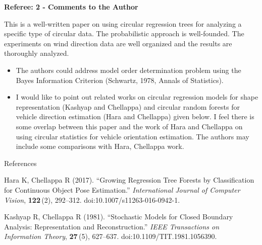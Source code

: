 \documentclass[english, noconfig]{uibklttr}
\newcommand{\section}[1]{{\Large{\textbf{#1}}}}
\begin{document}
\section{Referee: 2 - Comments to the Author}

This is a well-written paper on using circular regression trees for analyzing a
specific type of circular data. The probabilistic approach is well-founded. The
experiments on wind direction data are well organized and the results are
thoroughly analyzed.

\begin{itemize}
\item The authors could address model order determination problem using the
Bayes Information Criterion (Schwartz, 1978, Annals of Statistics).  

\item I would like to point out related works on circular regression models for
shape representation (Kashyap and Chellappa) and circular random forests for
vehicle direction estimation (Hara and Chellappa) given below. I feel there is
some overlap between this paper and the work of Hara and Chellappa on using
circular statistics for vehicle orientation estimation. The authors may include
some comparisons with Hara, Chellappa work.
\end{itemize}

\vspace{0.5cm}
References

Hara K, Chellappa R (2017). ``Growing Regression Tree Forests by
Classification for Continuous Object Pose Estimation.'' \emph{International
Journal of Computer Vision}, \textbf{122}\,(2), 292--312.
doi:10.1007/s11263-016-0942-1.

Kashyap R, Chellappa R (1981). ``Stochastic Models for Closed Boundary
Analysis: Representation and Reconstruction.'' \emph{IEEE Transactions on
Information Theory}, \textbf{27}\,(5), 627--637. doi:10.1109/TIT.1981.1056390.
\end{document}
